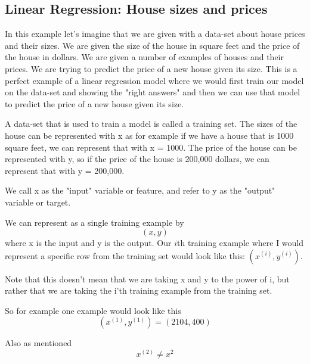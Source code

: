 \subsection{Linear Regression: House sizes and prices}
In this example let's imagine that we are given with a data-set about house prices and their sizes. We are given the size of the house in square feet and the price of the house in dollars. We are given a number of examples of houses and their prices. We are trying to predict the price of a new house given its size.
This is a perfect example of a linear regression model where we would first train our model on the data-set and showing the "right answers" and then we can use that model to predict the price of a new house given its size.

A data-set that is used to train a model is called a training set. The sizes of the house can be represented with x as for example if we  have a house that is 1000 square feet, we can represent that with x = 1000. The price of the house can be represented with y, so if the price of the house is 200,000 dollars, we can represent that with y = 200,000.

We call x as the "input" variable or feature, and refer to y as the "output" variable or target.

We can represent as a single training example by $$(x,y)$$ where x is the input and y is the output.
Our $i$th training example where I would represent a specific row from the training set would look like this: $(x^{(i)},y^{(i)})$.

Note that this doesn't mean that we are taking x and y to the power of i, but rather that we are taking the i'th training example from the training set.

So for example one example would look like this $$ (x^{(1)}, y^{(1)})=(2104,400) $$

Also as mentioned $$x^{(2)}\neq x^2$$


